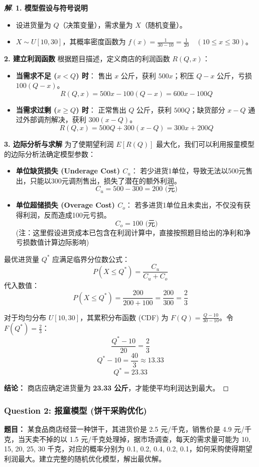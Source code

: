\documentclass[a4paper,12pt]{ctexart} %
\newenvironment{solution}{\begin{proof}[\textbf{解}]}{\end{proof}}
\begin{document}
	\begin{solution}
		\textbf{1. 模型假设与符号说明}
		\begin{itemize}
			\item 设进货量为 $Q$（决策变量），需求量为 $X$（随机变量）。
			\item $X \sim U[10, 30]$，其概率密度函数为 $f(x) = \frac{1}{30-10} = \frac{1}{20} \quad (10 \le x \le 30)$。
		\end{itemize}
		
		\textbf{2. 建立利润函数}
		根据题目描述，定义商店的利润函数 $R(Q, x)$：
		\begin{itemize}
			\item \textbf{当需求不足 ($x < Q$) 时}：
			售出 $x$ 公斤，获利 $500x$；积压 $Q-x$ 公斤，亏损 $100(Q-x)$。
			\[ R(Q, x) = 500x - 100(Q-x) = 600x - 100Q \]
			\item \textbf{当需求过剩 ($x \ge Q$) 时}：
			正常售出 $Q$ 公斤，获利 $500Q$；缺货部分 $x-Q$ 通过外部调剂解决，获利 $300(x-Q)$。
			\[ R(Q, x) = 500Q + 300(x-Q) = 300x + 200Q \]
		\end{itemize}
		
		\textbf{3. 边际分析与求解}
		为了使期望利润 $E[R(Q)]$ 最大化，我们可以利用报童模型的边际分析法确定模型参数：
		\begin{itemize}
			\item \textbf{单位缺货损失 (Underage Cost) $C_u$}：
			若少进货1单位，导致无法以500元售出，只能以300元调剂售出，损失了潜在的额外利润。
			\[ C_u = 500 - 300 = 200 \text{ (元)} \]
			\item \textbf{单位超储损失 (Overage Cost) $C_o$}：
			若多进货1单位且未卖出，不仅没有获得利润，反而造成100元亏损。
			\[ C_o = 100 \text{ (元)} \]
			\small{(注：这里假设进货成本已包含在利润计算中，直接按照题目给出的净利和净亏损数值计算边际影响)}
		\end{itemize}
		
		最优进货量 $Q^*$ 应满足临界分位数公式：
		\[ P(X \le Q^*) = \frac{C_u}{C_u + C_o} \]
		代入数值：
		\[ P(X \le Q^*) = \frac{200}{200 + 100} = \frac{200}{300} = \frac{2}{3} \]
		
		对于均匀分布 $U[10, 30]$，其累积分布函数 (CDF) 为 $F(Q) = \frac{Q-10}{30-10}$。令 $F(Q^*) = \frac{2}{3}$：
		\[ \frac{Q^* - 10}{20} = \frac{2}{3} \]
		\[ Q^* - 10 = \frac{40}{3} \approx 13.33 \]
		\[ Q^* = 23.33 \]
		
		\textbf{结论：} 商店应确定进货量为 \textbf{23.33 公斤}，才能使平均利润达到最大。
	\end{solution}
	
	\subsubsection*{Question 2: 报童模型 (饼干采购优化)}
	\textbf{题目：} 某食品商店经营一种饼干，其进货价是 2.5 元/千克，销售价是 4.9 元/千克，当天卖不掉的以 1.5 元/千克处理掉，据市场调查，每天的需求量可能为 10, 15, 20, 25, 30 千克，对应的概率分别为 0.1, 0.2, 0.4, 0.2, 0.1，如何采购使得期望利润最大。建立完整的随机优化模型，解出最优解。
	
\end{document}
